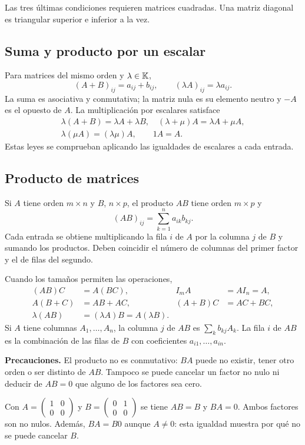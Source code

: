 Las tres últimas condiciones requieren matrices cuadradas. Una matriz
diagonal es triangular superior e inferior a la vez.

\subsection*{Suma y producto por un escalar}

Para matrices del mismo orden y $\lambda\in\mathbb{K}$,
\[
 (A+B)_{ij}=a_{ij}+b_{ij},\qquad (\lambda A)_{ij}=\lambda a_{ij}.
\]
La suma es asociativa y conmutativa; la matriz nula es su elemento neutro
y $-A$ es el opuesto de $A$. La multiplicación por escalares satisface
\[
 \begin{gathered}
 \lambda(A+B)=\lambda A+\lambda B,\quad
 (\lambda+\mu)A=\lambda A+\mu A,\\
 \lambda(\mu A)=(\lambda\mu)A,\qquad 1A=A.
 \end{gathered}
\]
Estas leyes se comprueban aplicando las igualdades de escalares a cada entrada.

\subsection*{Producto de matrices}

Si $A$ tiene orden $m\times n$ y $B$, $n\times p$, el producto $AB$ tiene
orden $m\times p$ y
\[
 (AB)_{ij}=\sum_{k=1}^{n}a_{ik}b_{kj}.
\]
Cada entrada se obtiene multiplicando la fila $i$ de $A$ por la columna $j$
de $B$ y sumando los productos. Deben coincidir el número de columnas
del primer factor y el de filas del segundo.

Cuando los tamaños permiten las operaciones,
\begin{align*}
 (AB)C&=A(BC), & I_mA&=AI_n=A,\\
 A(B+C)&=AB+AC, & (A+B)C&=AC+BC,\\
 \lambda(AB)&=(\lambda A)B=A(\lambda B).
\end{align*}
Si $A$ tiene columnas $A_1,\ldots,A_n$, la columna $j$ de $AB$ es
$\sum_k b_{kj}A_k$. La fila $i$ de $AB$ es la combinación de las filas
de $B$ con coeficientes $a_{i1},\ldots,a_{in}$.

\textbf{Precauciones.} El producto no es conmutativo: $BA$ puede no existir,
tener otro orden o ser distinto de $AB$. Tampoco se puede cancelar un
factor no nulo ni deducir de $AB=0$ que alguno de los factores sea cero.

\begin{ejemplo}
Con $A=\begin{pmatrix}1&0\\0&0\end{pmatrix}$ y
$B=\begin{pmatrix}0&1\\0&0\end{pmatrix}$ se tiene $AB=B$ y $BA=0$.
Ambos factores son no nulos. Además, $BA=B0$ aunque $A\ne0$:
esta igualdad muestra por qué no se puede cancelar $B$.
\end{ejemplo}

